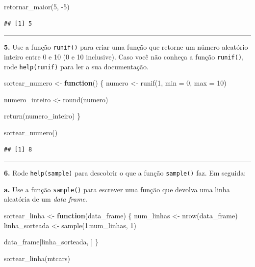 \documentclass[
]{book}
\newenvironment{Shaded}{\begin{snugshade}}{\end{snugshade}}
\newcommand{\AttributeTok}[1]{\textcolor[rgb]{0.77,0.63,0.00}{#1}}
\newcommand{\ControlFlowTok}[1]{\textcolor[rgb]{0.13,0.29,0.53}{\textbf{#1}}}
\newcommand{\DecValTok}[1]{\textcolor[rgb]{0.00,0.00,0.81}{#1}}
\newcommand{\FunctionTok}[1]{\textcolor[rgb]{0.00,0.00,0.00}{#1}}
\newcommand{\NormalTok}[1]{#1}
\newcommand{\OtherTok}[1]{\textcolor[rgb]{0.56,0.35,0.01}{#1}}
\newcommand{\SpecialCharTok}[1]{\textcolor[rgb]{0.00,0.00,0.00}{#1}}
\begin{document}
\begin{Shaded}
\begin{Highlighting}[]
\FunctionTok{retornar\_maior}\NormalTok{(}\DecValTok{5}\NormalTok{, }\SpecialCharTok{{-}}\DecValTok{5}\NormalTok{)}
\end{Highlighting}
\end{Shaded}

\begin{verbatim}
## [1] 5
\end{verbatim}

\begin{center}\rule{0.5\linewidth}{0.5pt}\end{center}

\textbf{5.} Use a função \texttt{runif()} para criar uma função que retorne um número aleatório inteiro entre 0 e 10 (0 e 10 inclusive). Caso você não conheça a função \texttt{runif()}, rode \texttt{help(runif)} para ler a sua documentação.

\begin{Shaded}
\begin{Highlighting}[]
\NormalTok{sortear\_numero }\OtherTok{\textless{}{-}} \ControlFlowTok{function}\NormalTok{() \{}
\NormalTok{  numero }\OtherTok{\textless{}{-}} \FunctionTok{runif}\NormalTok{(}\DecValTok{1}\NormalTok{, }\AttributeTok{min =} \DecValTok{0}\NormalTok{, }\AttributeTok{max =} \DecValTok{10}\NormalTok{)}
  
\NormalTok{  numero\_inteiro }\OtherTok{\textless{}{-}} \FunctionTok{round}\NormalTok{(numero)}
  
  \FunctionTok{return}\NormalTok{(numero\_inteiro)}
\NormalTok{\}}

\FunctionTok{sortear\_numero}\NormalTok{()}
\end{Highlighting}
\end{Shaded}

\begin{verbatim}
## [1] 8
\end{verbatim}

\begin{center}\rule{0.5\linewidth}{0.5pt}\end{center}

\textbf{6.} Rode \texttt{help(sample)} para descobrir o que a função \texttt{sample()} faz. Em seguida:

\textbf{a.} Use a função \texttt{sample()} para escrever uma função que devolva uma linha aleatória de um \emph{data frame}.

\begin{Shaded}
\begin{Highlighting}[]
\NormalTok{sortear\_linha }\OtherTok{\textless{}{-}} \ControlFlowTok{function}\NormalTok{(data\_frame) \{}
\NormalTok{  num\_linhas }\OtherTok{\textless{}{-}} \FunctionTok{nrow}\NormalTok{(data\_frame)}
\NormalTok{  linha\_sorteada }\OtherTok{\textless{}{-}} \FunctionTok{sample}\NormalTok{(}\DecValTok{1}\SpecialCharTok{:}\NormalTok{num\_linhas, }\DecValTok{1}\NormalTok{)}
  
\NormalTok{  data\_frame[linha\_sorteada, ]}
\NormalTok{\}}

\FunctionTok{sortear\_linha}\NormalTok{(mtcars)}
\end{Highlighting}
\end{Shaded}
\end{document}
